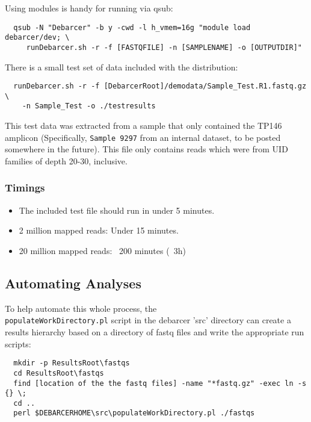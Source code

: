 \documentclass{article}
\begin{document}
Using modules is handy for running via qsub:

\begin{verbatim}
  qsub -N "Debarcer" -b y -cwd -l h_vmem=16g "module load debarcer/dev; \ 
	 runDebarcer.sh -r -f [FASTQFILE] -n [SAMPLENAME] -o [OUTPUTDIR]"
\end{verbatim}

There is a small test set of data included with the distribution:

\begin{verbatim}
  runDebarcer.sh -r -f [DebarcerRoot]/demodata/Sample_Test.R1.fastq.gz \
	-n Sample_Test -o ./testresults
\end{verbatim}

This test data was extracted from a sample that only contained the TP146 amplicon
\big(Specifically, \texttt{Sample 9297} from an internal dataset, to be posted somewhere in the future\big).
This file only contains reads which were from UID families of depth 20-30, inclusive.

\subsubsection{Timings}

\begin{itemize}
	\item The included test file should run in under 5 minutes.
	\item 2 million mapped reads: Under 15 minutes.
	\item 20 million mapped reads: ~200 minutes (~3h)
\end{itemize}


\subsection{Automating Analyses}

To help automate this whole process, the \\\texttt{populateWorkDirectory.pl} script in the 
debarcer 'src' directory can create a results hierarchy based on a
directory of fastq files and write the appropriate run scripts:

\begin{verbatim}
  mkdir -p ResultsRoot\fastqs
  cd ResultsRoot\fastqs
  find [location of the the fastq files] -name "*fastq.gz" -exec ln -s {} \;
  cd ..
  perl $DEBARCERHOME\src\populateWorkDirectory.pl ./fastqs
\end{verbatim}
\end{document}
